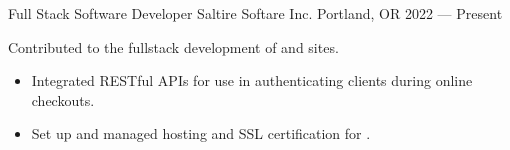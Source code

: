 \showoff
{Full Stack Software Developer}
{Saltire Softare Inc.}
{Portland, OR}
{2022 --- Present}

Contributed to the fullstack development of  and  sites.

\begin{itemize}[label=$\triangleright$]
    \item Integrated RESTful APIs for use in authenticating clients during online checkouts.
    \item Set up and managed hosting and SSL certification for .
\end{itemize}
